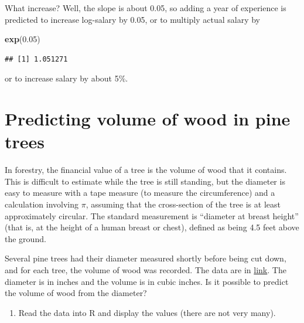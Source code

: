 \documentclass[]{tufte-book}
\newenvironment{Shaded}{}{}
\newcommand{\FloatTok}[1]{\textcolor[rgb]{0.25,0.63,0.44}{#1}}
\newcommand{\KeywordTok}[1]{\textcolor[rgb]{0.00,0.44,0.13}{\textbf{#1}}}
\newcommand{\NormalTok}[1]{#1}
\providecommand{\tightlist}{%
  \setlength{\itemsep}{0pt}\setlength{\parskip}{0pt}}
\theoremstyle{definition}
\theoremstyle{definition}
\theoremstyle{definition}
\theoremstyle{remark}
\begin{document}
What increase? Well, the slope is about 0.05, so adding a year of
experience is predicted to increase log-salary by 0.05, or to multiply
actual salary by

\begin{Shaded}
\begin{Highlighting}[]
\KeywordTok{exp}\NormalTok{(}\FloatTok{0.05}\NormalTok{)}
\end{Highlighting}
\end{Shaded}

\begin{verbatim}
## [1] 1.051271
\end{verbatim}

or to increase salary by about 5\%.

\hypertarget{predicting-volume-of-wood-in-pine-trees}{%
\section{Predicting volume of wood in pine
trees}\label{predicting-volume-of-wood-in-pine-trees}}

In forestry, the financial value of a tree is the volume of wood that it
contains. This is difficult to estimate while the tree is still
standing, but the diameter is easy to measure with a tape measure (to
measure the circumference) and a calculation involving \(\pi\), assuming
that the cross-section of the tree is at least approximately circular.
The standard measurement is ``diameter at breast height'' (that is, at
the height of a human breast or chest), defined as being 4.5 feet above
the ground.

Several pine trees had their diameter measured shortly before being cut
down, and for each tree, the volume of wood was recorded. The data are
in \href{http://www.utsc.utoronto.ca/~butler/c32/pinetrees.txt}{link}.
The diameter is in inches and the volume is in cubic inches. Is it
possible to predict the volume of wood from the diameter?

\begin{enumerate}
\def\labelenumi{(\alph{enumi})}
\tightlist
\item
  Read the data into R and display the values (there are not very many).
\end{enumerate}
\end{document}
